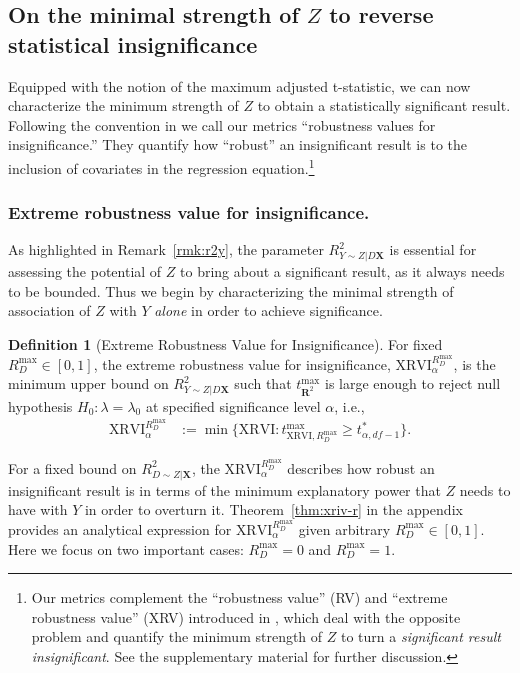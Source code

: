 \documentclass[sts]{imsart}
\theoremstyle{plain}
\theoremstyle{definition}
\newtheorem{definition}{Definition}
\newcommand{\df}{df}
\newcommand{\tmax}{t_{\boldsymbol{R}^2}^{\max}}
\newcommand{\Ry}{R^2_{Y\sim Z | D\mathbf{X}}}
\newcommand{\Rd}{R^2_{D\sim Z | \mathbf{X}}}
\newcommand{\Rdmax}{R^{\max }_{D}}
\newcommand{\tstar}{t^*_{\alpha, \df-1}}
\newcommand{\XRVI}{\text{XRVI}}
\begin{document}
    


\subsection{On the minimal strength of \texorpdfstring{$Z$}{Z} to reverse statistical insignificance}




Equipped with the notion of the maximum adjusted \mbox{t-statistic}, we can now characterize the minimum strength of $Z$ to obtain a statistically significant result. Following  the convention in \cite{cinelli_making_2020, cinelli2025omitted} we call our metrics ``robustness values for insignificance.'' They quantify how ``robust'' an insignificant result is to the inclusion of covariates in the regression equation.\footnote{Our metrics complement the ``robustness value'' (RV) and ``extreme robustness value'' (XRV) introduced in \cite{cinelli_making_2020, cinelli2025omitted}, which deal with the opposite problem  and quantify the minimum strength of $Z$ to turn a \emph{significant result insignificant}. See the supplementary material for further discussion.}

\subsubsection{Extreme robustness value for insignificance.}
As highlighted in Remark~\ref{rmk:r2y}, the parameter $\Ry$ is essential for assessing the potential of $Z$ to bring about a significant result, as it always needs to be bounded. Thus we begin by characterizing the minimal strength of association of $Z$ with $Y$ \emph{alone} in order to achieve significance. 



\begin{definition}[Extreme Robustness Value for Insignificance]
    For fixed $\Rdmax \in [0,1]$, the extreme robustness value for insignificance, $\XRVI^{\Rdmax}_{\alpha}$, is the minimum upper bound on $\Ry$ such that 
    $\tmax$ is large enough to reject null hypothesis $H_0: \lambda = \lambda_0$ at specified significance level $\alpha$, i.e.,
    \begin{align*}
        \XRVI^{\Rdmax}_{\alpha} &:= \min \{ \text{XRVI}:  t_{\text{XRVI},\Rdmax}^{\max} \geq \tstar \}.
    \end{align*}
\end{definition}

For a fixed bound on $\Rd$, the $\XRVI^{\Rdmax}_{\alpha}$ describes how robust an insignificant result is in terms of the minimum explanatory power that $Z$ needs to have with $Y$ in order to overturn it.
Theorem~\ref{thm:xriv-r} in the appendix provides an analytical expression for $\XRVI^{\Rdmax}_{\alpha}$ given arbitrary $\Rdmax\in[0,1]$. Here we focus on two important cases: $\Rdmax=0$ and $\Rdmax=1$.
\end{document}
